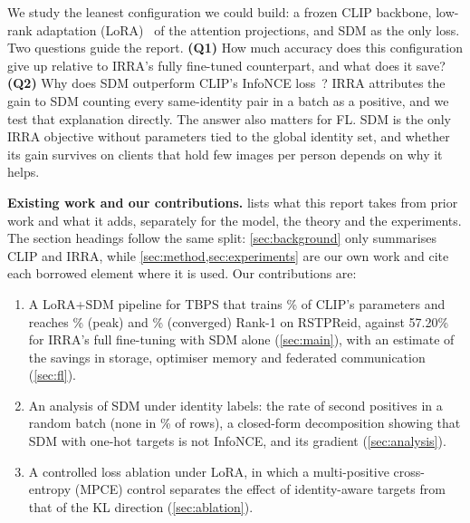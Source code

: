 We study the leanest configuration we could build: a frozen CLIP backbone, low-rank adaptation (LoRA)~\cite{hu2021loralowrankadaptationlarge} of the attention projections, and SDM as the only loss. Two questions guide the report. \textbf{(Q1)} How much accuracy does this configuration give up relative to IRRA's fully fine-tuned counterpart, and what does it save? \textbf{(Q2)} Why does SDM outperform CLIP's InfoNCE loss~\cite{oord2019representationlearningcontrastivepredictive}? IRRA attributes the gain to SDM counting every same-identity pair in a batch as a positive, and we test that explanation directly. The answer also matters for FL. SDM is the only IRRA objective without parameters tied to the global identity set, and whether its gain survives on clients that hold few images per person depends on why it helps.

\textbf{Existing work and our contributions.}  lists what this report takes from prior work and what it adds, separately for the model, the theory and the experiments. The section headings follow the same split: \cref{sec:background} \tagE{} only summarises CLIP and IRRA, while \cref{sec:method,sec:experiments} \tagO{} are our own work and cite each borrowed element where it is used. Our contributions are:
\begin{enumerate}
  \item A LoRA+SDM pipeline for TBPS that trains \trainPct\% of CLIP's parameters and reaches \sdmPeakR\% (peak) and \sdmConvR\% (converged) Rank-1 on RSTPReid, against 57.20\% for IRRA's full fine-tuning with SDM alone (\cref{sec:main}), with an estimate of the savings in storage, optimiser memory and federated communication (\cref{sec:fl}).
  \item An analysis of SDM under identity labels: the rate of second positives in a random batch (none in \oneHotFrac\% of rows), a closed-form decomposition showing that SDM with one-hot targets is not InfoNCE, and its gradient (\cref{sec:analysis}).
  \item A controlled loss ablation under LoRA, in which a multi-positive cross-entropy (MPCE) control separates the effect of identity-aware targets from that of the KL direction (\cref{sec:ablation}).
\end{enumerate}

